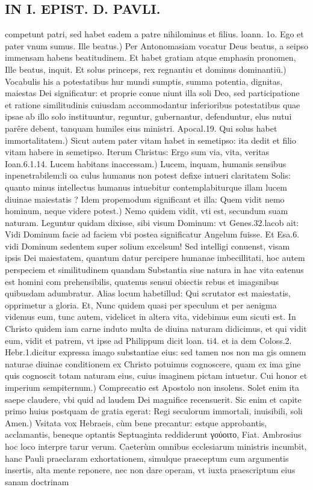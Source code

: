 \documentclass{article}
\begin{document}
\begin{pages}
\section*{IN I. EPIST. D. PAVLI. }
\marginpar{[ p.130 ]}\pstart competunt patri, sed habet eadem a patre nihilominus et filius. loann. 1o. Ego et pater vnum sumus.  \pend\pstart Ille beatus.) Per Antonomasiam vocatur Deus beatus, a seipso immensam habens beatitudinem. Et habet gratiam atque emphasin pronomen, Ille beatus, inquit.  \pend\pstart Et solus princeps, rex regnantiu et dominus dominantiü.) Vocabulis his a potestatibus hur mundi sumptis, summa potentia, dignitas, maiestas Dei significatur: et proprie conue niunt illa soli Deo, sed participatione et ratione similitudinis cuiusdam accommodantur inferioribus potestatibus quae ipsae ab illo solo instituuntur, reguntur, gubernantur, defenduntur, elus nutui parêre debent, tanquam humiles eius ministri. Apocal.19.  \pend\pstart Qui solus habet immortalitatem.) Sicut autem pater vitam habet in semetipso: ita dedit et filio vitam habere in semetipso. Iterum Christus: Ergo sum via, vita, veritas Ioan.6.1.14.  \pend\pstart Lucem habitans inaccessam.) Lucem, inquam, humanis sensibus inpenetrabilem:li oa culus humanus non potest defixe intueri claritatem Solis: quanto minus intellectus humanus intuebitur contemplabiturque illam lucem diuinae maiestatis ? Idem propemodum significant et illa:  \pend\pstart Quem vidit nemo hominum, neque videre potest.) Nemo quidem vidit, vti est, secundum suam naturam. Leguntur quidam dixisse, sibi visum Dominum: vt Genes.32.lacob ait: Vidi Dominum facie ad faciem vbi postea significatur Angelum fuisse. Et Esa.6. vidi Dominum sedentem super solium excelsum! Sed intelligi conuenst, visam ipsis Dei maiestatem, quantum datur percipere humanae imbecillitati, hoc autem perspeciem et similitudinem quandam Substantia siue natura in hac vita eatenus est homini com prehensibilis, quatenus sensui obiectis rebus et imagsnibus quibusdam adumbratur. Alias locum habetillud: Qui scrutator est maiestatis, opprimetur a gloria. Et, Nunc quidem quasi per speculum et per aenigma videmus eum, tunc autem, videlicet in altera vita, videbimus eum sicuti est. In Christo quidem iam carne induto multa de diuina naturam didicimus, et qui vidit eum, vidit et patrem, vt ipse ad Philippum dicit loan. ti4. et ia dem Coloss.2. Hebr.1.dicitur expressa imago substantiae eius: sed tamen nos non ma gis omnem naturae diuinae conditionem ex Christo potuimus cognoscere, quam ex ima gine quis cognoscit totam naturam eius, cuius imaginem pictam intuetur.  \pend\pstart Cui honor et imperium sempiternum.) Comprecatio est Apostolo non insolens. Solet enim ita saepe claudere, vbi quid ad laudem Dei magnifice recensuerit. Sic enim et capite primo huius postquam de gratia egerat: Regi seculorum immortali, inuisibili, soli  \pend\pstart Amen.) Vsitata vox Hebraeis, cùm bene precantur: estque approbantis, acclamantis, beneque optantis Septuaginta reddiderunt γούοιτο, Fiat. Ambrosius hoc loco interpre tarur verum. Caeterùm omnibus ecclesiarum ministris incumbit, hanc Pauli praeclaram exhortationem, simulque praeceptum cum argumentis insertis, alta mente reponere, nec non dare operam, vt iuxta praescriptum eius sanam doctrinam 
\end{pages}
\end{document}
